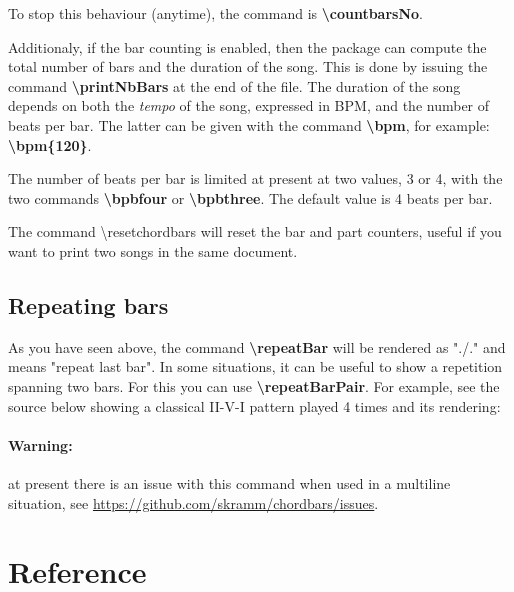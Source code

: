\documentclass[11pt]{article}
\newcommand{\btt}{\bfseries \ttfamily }
\newcommand{\tbs}{\textbackslash{}}
\begin{document}
To stop this behaviour (anytime), the command is {\btt \tbs countbarsNo}.

Additionaly, if the bar counting is enabled, then the package can compute the total number of bars and the duration of the song.
This is done by issuing the command {\btt \tbs printNbBars} at the end of the file.
The duration of the song depends on both the {\em tempo} of the song, expressed in BPM, and the number of beats per bar.
The latter can be given with the command {\btt \tbs bpm}, for example:
{\btt \tbs bpm\{120\}}.

The number of beats per bar is limited at present at two values, 3 or 4, with the two commands
{\btt \tbs bpbfour} or {\btt \tbs bpbthree}.
The default value is 4 beats per bar.

The command {\ttfamily \textbackslash resetchordbars} will reset the bar and part counters, useful if you want to print two songs in the same document.

\subsection{Repeating bars}

As you have seen above, the command {\btt \tbs repeatBar} will be rendered as "./."
and means "repeat last bar".
In some situations, it can be useful to show a repetition spanning two bars.
For this you can use {\btt \tbs repeatBarPair}.
For example, see the source below showing a classical II-V-I pattern played 4 times and its rendering:

\def\NumberOfBarsPerLine{8}

\vspace{1em}
\noindent

%
\countbarsNo


\paragraph{Warning:} at present there is an issue with this command when used in a multiline situation, see \url{https://github.com/skramm/chordbars/issues}.

\section{Reference}
\end{document}
